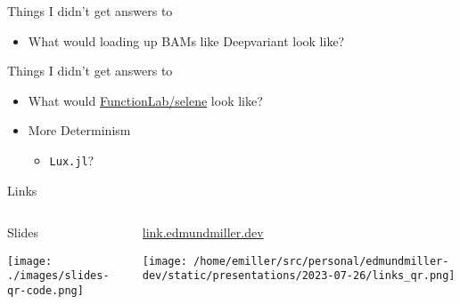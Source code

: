 \documentclass[bigger]{beamer}
\begin{document}
\begin{frame}[label={sec:orgbe1b816}]{Things I didn't get answers to}
\begin{itemize}
\item What would loading up BAMs like Deepvariant look like?
\end{itemize}
\begin{center}

\end{center}
\end{frame}

\begin{frame}[label={sec:orgefa6c64},fragile]{Things I didn't get answers to}
 \begin{itemize}
\item What would \href{https://github.com/FunctionLab/selene}{FunctionLab/selene} look like?
\end{itemize}

\begin{itemize}
\item More Determinism
\begin{itemize}
\item \texttt{Lux.jl}?
\end{itemize}
\end{itemize}
\end{frame}
\begin{frame}[label={sec:org67e0e3c}]{Links}
\begin{columns}
\begin{column}{0.5\columnwidth}
Slides
\begin{center}
\texttt{[image: ./images/slides-qr-code.png]}
\end{center}
\end{column}

\begin{column}{0.5\columnwidth}
\href{https:link.edmundmiller.dev}{link.edmundmiller.dev}
\begin{center}
\texttt{[image: /home/emiller/src/personal/edmundmiller-dev/static/presentations/2023-07-26/links\_qr.png]}
\end{center}
\end{column}
\end{columns}
\end{frame}
\end{document}
